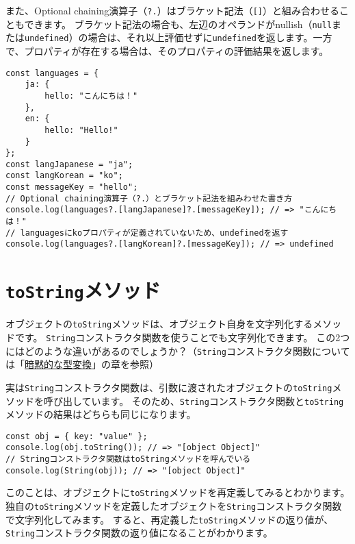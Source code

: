 また、Optional chaining演算子（\texttt{?.}）はブラケット記法（\texttt{[]}）と組み合わせることもできます。
ブラケット記法の場合も、左辺のオペランドがnullish（\texttt{null}または\texttt{undefined}）の場合は、それ以上評価せずに\texttt{undefined}を返します。一方で、プロパティが存在する場合は、そのプロパティの評価結果を返します。

\begin{lstlisting}
const languages = {
    ja: {
        hello: "こんにちは！"
    },
    en: {
        hello: "Hello!"
    }
};
const langJapanese = "ja";
const langKorean = "ko";
const messageKey = "hello";
// Optional chaining演算子（?.）とブラケット記法を組みわせた書き方
console.log(languages?.[langJapanese]?.[messageKey]); // => "こんにちは！"
// languagesにkoプロパティが定義されていないため、undefinedを返す
console.log(languages?.[langKorean]?.[messageKey]); // => undefined
\end{lstlisting}

\hypertarget{toString-method}{%
\section{\texorpdfstring{\texttt{toString}メソッド}{toStringメソッド}}\label{toString-method}}

オブジェクトの\texttt{toString}メソッドは、オブジェクト自身を文字列化するメソッドです。
\texttt{String}コンストラクタ関数を使うことでも文字列化できます。
この2つにはどのような違いがあるのでしょうか？（\texttt{String}コンストラクタ関数については「\hyperlink{implicit-coercion}{暗黙的な型変換}」の章を参照）

実は\texttt{String}コンストラクタ関数は、引数に渡されたオブジェクトの\texttt{toString}メソッドを呼び出しています。\enlargethispage{\baselineskip}
そのため、\texttt{String}コンストラクタ関数と\texttt{toString}メソッドの結果はどちらも同じになります。

\begin{lstlisting}
const obj = { key: "value" };
console.log(obj.toString()); // => "[object Object]"
// Stringコンストラクタ関数はtoStringメソッドを呼んでいる
console.log(String(obj)); // => "[object Object]"
\end{lstlisting}

\enlargethispage{\baselineskip}このことは、オブジェクトに\texttt{toString}メソッドを再定義してみるとわかります。
独自の\texttt{toString}メソッドを定義したオブジェクトを\texttt{String}コンストラクタ関数で文字列化してみます。
すると、再定義した\texttt{toString}メソッドの返り値が、\texttt{String}コンストラクタ関数の返り値になることがわかります。

